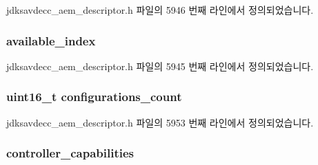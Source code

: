 jdksavdecc\+\_\+aem\+\_\+descriptor.\+h 파일의 5946 번째 라인에서 정의되었습니다.

\subsubsection[{\texorpdfstring{available\+\_\+index}{available_index}}]{ available\+\_\+index}\hypertarget{structjdksavdecc__descriptor__entity_abbe4a72641a81cba6569feb1a446d431}{}\label{structjdksavdecc__descriptor__entity_abbe4a72641a81cba6569feb1a446d431}


jdksavdecc\+\_\+aem\+\_\+descriptor.\+h 파일의 5945 번째 라인에서 정의되었습니다.

\subsubsection[{\texorpdfstring{configurations\+\_\+count}{configurations_count}}]{\setlength{\rightskip}{0pt plus 5cm}uint16\+\_\+t configurations\+\_\+count}\hypertarget{structjdksavdecc__descriptor__entity_acd98c5a873e9714692b16260d1e9ea0f}{}\label{structjdksavdecc__descriptor__entity_acd98c5a873e9714692b16260d1e9ea0f}


jdksavdecc\+\_\+aem\+\_\+descriptor.\+h 파일의 5953 번째 라인에서 정의되었습니다.

\subsubsection[{\texorpdfstring{controller\+\_\+capabilities}{controller_capabilities}}]{ controller\+\_\+capabilities}\hypertarget{structjdksavdecc__descriptor__entity_a66f07a4a428e308f20990a0e6bbfea0c}{}\label{structjdksavdecc__descriptor__entity_a66f07a4a428e308f20990a0e6bbfea0c}


